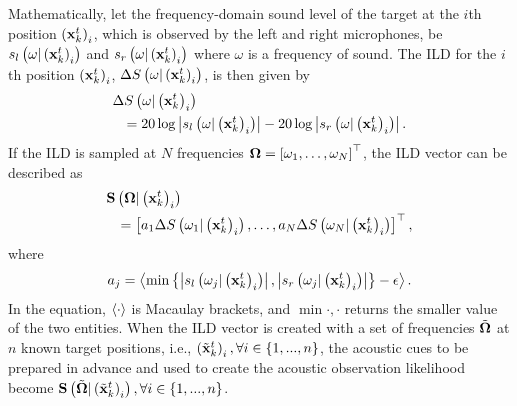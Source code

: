 Mathematically, let the frequency-domain sound \linebreak[4]level of the target at the $i$th position $\left ( \mathbf{x}_{k}^{t} \right )_{i}$, which is observed by the left and right microphones, be $s_l\left ( \omega|\left ( \mathbf{x}_{k}^{t} \right )_{i} \right )$ and $s_r\left ( \omega|\left ( \mathbf{x}_{k}^{t} \right )_{i} \right )$ where $\omega$ is a frequency of sound.  The ILD for the $i$th position $\left ( \mathbf{x}_{k}^{t} \right )_{i}$, $\Delta S\left ( \omega|\left ( \mathbf{x}_{k}^{t} \right )_i \right )$, is then given by 
\begin{eqnarray}\label{eq:ILD}
\lefteqn{\Delta S\bs{\omega|\bs{\Vxbp{k}{t}}_i}} \nonumber\\  &&= 20 \log \abs{s_l\bs{\omega|\bs{\Vxbp{k}{t}}_{i}}} - 20 \log \abs{s_r\bs{\omega|\bs{\Vxbp{k}{t}}_{i}}}.  
\end{eqnarray}
If the ILD is sampled at $N$ frequencies {\small{$\mathbf{\Omega} = \left [ \omega_1,\ldots,\omega_N \right ]^\top$}}, the ILD vector can be described as 
\begin{eqnarray}\label{eq:ILDs}
\lefteqn{\V{S}\bs{\V{\Omega}|\bs{\Vxbp{k}{t}}_i}}\nonumber\\ &&= \bl{a_1 \Delta S\bs{\omega_1|\bs{\Vxbp{k}{t}}_i},\ldots, a_N \Delta S\bs{\omega_N|\bs{\Vxbp{k}{t}}_i}}^\top,
\end{eqnarray}
where 
\begin{equation}
a_{j} = \left < \min\left \{ \left | s_l\left ( \omega_j|\left ( \mathbf{x}_{k}^{t} \right )_{i} \right ) \right |,\left | s_r\left ( \omega_j|\left ( \mathbf{x}_{k}^{t} \right )_{i} \right ) \right | \right \}-\epsilon \right >. 
\end{equation}
In the equation, $\left < \cdot \right >$ is Macaulay brackets, and $\min\bm{\cdot,\cdot}$ returns the smaller value of the two entities.  When the ILD vector is created with a set of frequencies $\mbox{$\tilde{\bf \Omega}$}$ at $n$ known target positions, i.e., $\left ( \tilde {\mathbf{x}}_{k}^{t} \right )_i, \forall i \in \left \{ 1,...,n \right \}$, the acoustic cues to be prepared in advance and used to create the acoustic observation likelihood become $\mathbf{S}\left ( \mbox{$\tilde{\bf \Omega}$}|\left ( \tilde {\mathbf{x}}_{k}^{t} \right )_i \right ), \forall i \in \left \{ 1,...,n \right \}$.  

